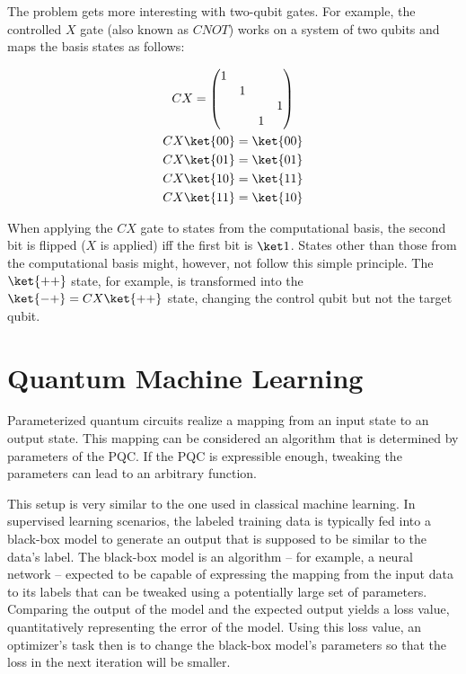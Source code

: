 The problem gets more interesting with two-qubit gates.
For example, the controlled $X$ gate (also known as $CNOT$) works on a system
of two qubits and maps the basis states as follows:

\begin{gather}
    \label{eq:cx-zbasis}
    CX = \begin{pmatrix}
        1&&&\\
        &1&&\\
        &&&1\\
        &&1&
    \end{pmatrix}\\
    CX \ket{00} = \ket{00}\\
    CX \ket{01} = \ket{01}\\
    CX \ket{10} = \ket{11}\\
    CX \ket{11} = \ket{10}
\end{gather}

When applying the $CX$ gate to states from the computational basis, the second
bit is flipped ($X$ is applied) iff the first bit is $\ket 1$.
States other than those from the computational basis might, however, not follow
this simple principle.
The $\ket{++}$ state, for example, is transformed into the
$\ket{-+} = CX \ket{++}$ state, changing the control qubit but not the target
qubit.

\section{Quantum Machine Learning}
Parameterized quantum circuits realize a mapping from an input state to an
output state.
This mapping can be considered an algorithm that is determined by parameters of
the PQC.
If the PQC is expressible enough, tweaking the parameters can lead to an
arbitrary function.

This setup is very similar to the one used in classical machine learning.
In supervised learning scenarios, the labeled training data is typically fed
into a black-box model to generate an output that is supposed to be similar to
the data's label.
The black-box model is an algorithm -- for example, a neural network -- expected
to be capable of expressing the mapping from the input data to its labels that
can be tweaked using a potentially large set of parameters.
Comparing the output of the model and the expected output yields a loss value,
quantitatively representing the error of the model.
Using this loss value, an optimizer's task then is to change the black-box
model's parameters so that the loss in the next iteration will be smaller.

